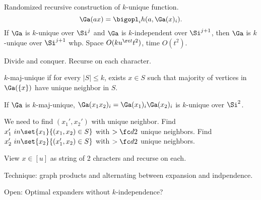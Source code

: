 Randomized recursive construction of $k$-unique function. 
\[
\Ga(ax)=\bigopl_i h(a,\Ga(x)_i).
\]
If $\Ga$ is $k$-unique over $\Si^j$ and $\Ga$ is $k$-independent over $\Si^{j+1}$, then $\Ga$ is $k$-unique over $\Si^{j+1}$ whp.
Space $O(ku^{\rc t}t^2)$, time $O(t^2)$.

Divide and conquer. Recurse on each character.
\begin{df}
$k$-maj-unique if for every $|S|\le k$, exists $x\in S$ such that majority of vertices in $\Ga(\{x\})$ have unique neighbor in $S$.
\end{df}
If $\Ga$ is $k$-maj-unique, $\Ga(x_1x_2)_i=\Ga(x_1)_i\Ga(x_2)_i$ is $k$-unique over $\Si^2$.

We need to find $(x_1',x_2')$ with unique neighbor. 
Find $x_1'\ in \set{x_1}{(x_1,x_2)\in S}$ with $>\fc d2$ unique neighbors.
Find $x_2'\ in \set{x_2}{(x_1',x_2)\in S}$ with $>\fc d2$ unique neighbors.

View $x\in [u]$ as string of 2 chracters and recurse on each.


Technique: graph products and alternating between expansion and indpendence. 

Open: Optimal expanders without $k$-independence?